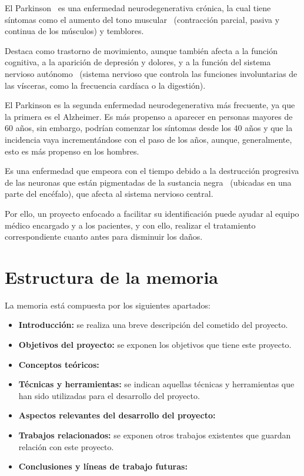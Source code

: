 El Parkinson~\cite{parkinson} es una enfermedad neurodegenerativa crónica, la cual tiene síntomas como el aumento del tono muscular~\cite{tonomuscular} (contracción parcial, pasiva y continua de los músculos) y temblores.

Destaca como trastorno de movimiento, aunque también afecta a la función cognitiva, a la aparición de depresión y dolores, y a la función del sistema nervioso autónomo~\cite{sistnervautonomo} (sistema nervioso que controla las funciones involuntarias de las vísceras, como la frecuencia cardíaca o la digestión).

El Parkinson es la segunda enfermedad neurodegenerativa más frecuente, ya que la primera es el Alzheimer. Es más propenso a aparecer en personas mayores de 60 años, sin embargo, podrían comenzar los síntomas desde los 40 años y que la incidencia vaya incrementándose con el paso de los años, aunque, generalmente, esto es más propenso en los hombres.

Es una enfermedad que empeora con el tiempo debido a la destrucción progresiva de las neuronas que están pigmentadas de la sustancia negra~\cite{sustancianegra} (ubicadas en una parte del encéfalo), que afecta al sistema nervioso central.

Por ello, un proyecto enfocado a facilitar su identificación puede ayudar al equipo médico encargado y a los pacientes, y con ello, realizar el tratamiento correspondiente cuanto antes para disminuir los daños.

\section{Estructura de la memoria}
La memoria está compuesta por los siguientes apartados:
\begin{itemize}
	\item \textbf{Introducción:} se realiza una breve descripción del cometido del proyecto.
	\item \textbf{Objetivos del proyecto:} se exponen los objetivos que tiene este proyecto.
	\item \textbf{Conceptos teóricos:}
	\item \textbf{Técnicas y herramientas:} se indican aquellas técnicas y herramientas que han sido utilizadas para el desarrollo del proyecto.
	\item \textbf{Aspectos relevantes del desarrollo del proyecto:}
	\item \textbf{Trabajos relacionados:} se exponen otros trabajos existentes que guardan relación con este proyecto.
	\item \textbf{Conclusiones y líneas de trabajo futuras:}
\end{itemize}

